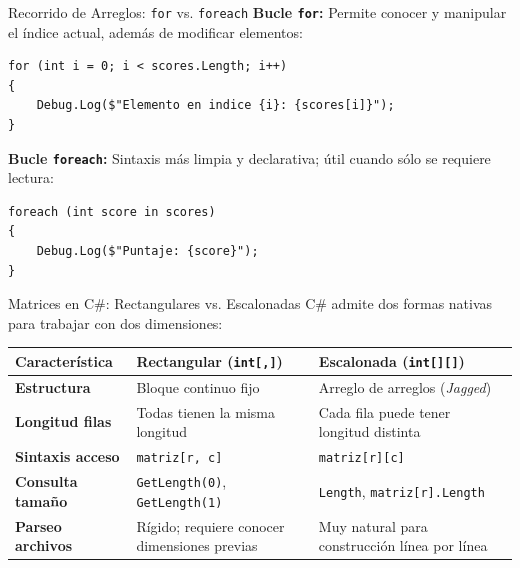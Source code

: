 \documentclass{beamer}
\begin{document}
\begin{frame}[fragile]{Recorrido de Arreglos: \texttt{for} vs. \texttt{foreach}}
\lstset{style=CSharpStyle}
\textbf{Bucle \texttt{for}:} Permite conocer y manipular el \'indice actual, adem\'as de modificar elementos:
\begin{lstlisting}
for (int i = 0; i < scores.Length; i++)
{
    Debug.Log($"Elemento en indice {i}: {scores[i]}");
}
\end{lstlisting}

\vspace{0.2cm}
\textbf{Bucle \texttt{foreach}:} Sintaxis m\'as limpia y declarativa; \'util cuando s\'olo se requiere lectura:
\begin{lstlisting}
foreach (int score in scores)
{
    Debug.Log($"Puntaje: {score}");
}
\end{lstlisting}
\end{frame}

\begin{frame}{Matrices en C\#: Rectangulares vs. Escalonadas}
  C\# admite dos formas nativas para trabajar con dos dimensiones:

  \vspace{0.3cm}
  \begin{table}
    \centering
    \footnotesize
    \begin{tabular}{|l|p{4.2cm}|p{4.2cm}|}
      \hline
      \textbf{Caracter\'istica} & \textbf{Rectangular (\texttt{int[,]})} & \textbf{Escalonada (\texttt{int[][]})} \\ \hline
      \textbf{Estructura} & Bloque continuo fijo & Arreglo de arreglos (\textit{Jagged}) \\ \hline
      \textbf{Longitud filas} & Todas tienen la misma longitud & Cada fila puede tener longitud distinta \\ \hline
      \textbf{Sintaxis acceso} & \texttt{matriz[r, c]} & \texttt{matriz[r][c]} \\ \hline
      \textbf{Consulta tama\~no} & \texttt{GetLength(0)}, \texttt{GetLength(1)} & \texttt{Length}, \texttt{matriz[r].Length} \\ \hline
      \textbf{Parseo archivos} & R\'igido; requiere conocer dimensiones previas & Muy natural para construcci\'on l\'inea por l\'inea \\ \hline
    \end{tabular}
  \end{table}
\end{frame}
\end{document}
